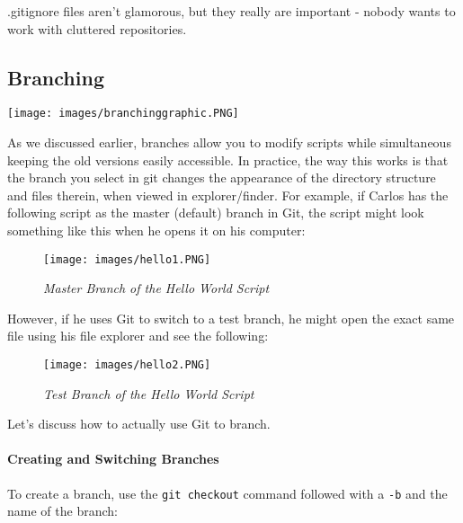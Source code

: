 \documentclass[
]{book}
\newenvironment{Shaded}{\begin{snugshade}}{\end{snugshade}}
\newcommand{\NormalTok}[1]{#1}
\newcommand{\SpecialCharTok}[1]{\textcolor[rgb]{0.00,0.00,0.00}{#1}}
\begin{document}
.gitignore files aren't glamorous, but they really are important - nobody wants to work with cluttered repositories.

\hypertarget{branching}{%
\subsection{Branching}\label{branching}}

\texttt{[image: images/branchinggraphic.PNG]}

As we discussed earlier, branches allow you to modify scripts while simultaneous keeping the old versions easily accessible. In practice, the way this works is that the branch you select in git changes the appearance of the directory structure and files therein, when viewed in explorer/finder. For example, if Carlos has the following script as the master (default) branch in Git, the script might look something like this when he opens it on his computer:

\begin{figure}
\centering
\texttt{[image: images/hello1.PNG]}
\caption{\emph{Master Branch of the Hello World Script}}
\end{figure}

However, if he uses Git to switch to a test branch, he might open the exact same file using his file explorer and see the following:

\begin{figure}
\centering
\texttt{[image: images/hello2.PNG]}
\caption{\emph{Test Branch of the Hello World Script}}
\end{figure}

Let's discuss how to actually use Git to branch.

\hypertarget{creating-and-switching-branches}{%
\paragraph{Creating and Switching Branches}\label{creating-and-switching-branches}}

To create a branch, use the \texttt{git\ checkout} command followed with a \texttt{-b} and the name of the branch:

\begin{Shaded}
\end{Shaded}
\end{document}
